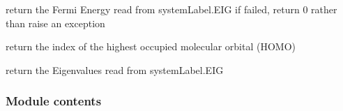 \documentclass[letterpaper,10pt,english]{sphinxmanual}
\begin{document}

\begin{fulllineitems}
\label{pyramids.io:pyramids.io.result.getFermiEnergy}
return the Fermi Energy read from systemLabel.EIG
if failed, return 0 rather than raise an exception

\end{fulllineitems}


\begin{fulllineitems}
\label{pyramids.io:pyramids.io.result.getHomo}
return the index of the highest occupied molecular orbital (HOMO)

\end{fulllineitems}


\begin{fulllineitems}
\label{pyramids.io:pyramids.io.result.getTrajactory}
\end{fulllineitems}


\begin{fulllineitems}
\label{pyramids.io:pyramids.io.result.loadSaved}
\end{fulllineitems}


\begin{fulllineitems}
\label{pyramids.io:pyramids.io.result.readEigFile}
return the Eigenvalues read from systemLabel.EIG

\end{fulllineitems}



\subsubsection{Module contents}
\label{pyramids.io:module-contents}\label{pyramids.io:module-pyramids.io}
\end{document}
